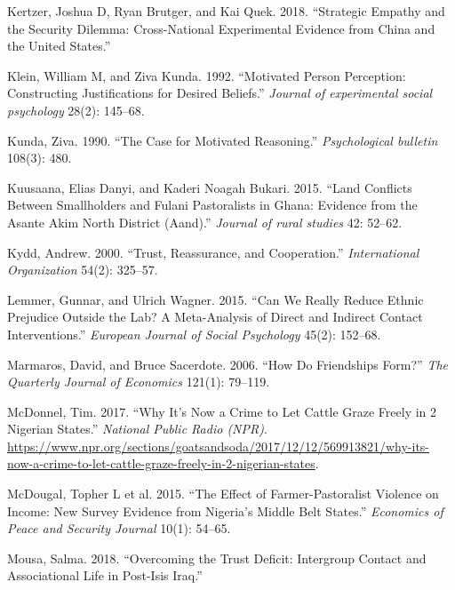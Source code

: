\documentclass[11pt]{article}
\begin{document}
\leavevmode\hypertarget{ref-kertzer2018empathy}{}%
Kertzer, Joshua D, Ryan Brutger, and Kai Quek. 2018. ``Strategic Empathy
and the Security Dilemma: Cross-National Experimental Evidence from
China and the United States.''

\leavevmode\hypertarget{ref-klein1992motivated}{}%
Klein, William M, and Ziva Kunda. 1992. ``Motivated Person Perception:
Constructing Justifications for Desired Beliefs.'' \emph{Journal of
experimental social psychology} 28(2): 145--68.

\leavevmode\hypertarget{ref-kunda1990motivatedReasoning}{}%
Kunda, Ziva. 1990. ``The Case for Motivated Reasoning.''
\emph{Psychological bulletin} 108(3): 480.

\leavevmode\hypertarget{ref-kuusaana2015land}{}%
Kuusaana, Elias Danyi, and Kaderi Noagah Bukari. 2015. ``Land Conflicts
Between Smallholders and Fulani Pastoralists in Ghana: Evidence from the
Asante Akim North District (Aand).'' \emph{Journal of rural studies} 42:
52--62.

\leavevmode\hypertarget{ref-kydd2000trust}{}%
Kydd, Andrew. 2000. ``Trust, Reassurance, and Cooperation.''
\emph{International Organization} 54(2): 325--57.

\leavevmode\hypertarget{ref-lemmer2015can}{}%
Lemmer, Gunnar, and Ulrich Wagner. 2015. ``Can We Really Reduce Ethnic
Prejudice Outside the Lab? A Meta-Analysis of Direct and Indirect
Contact Interventions.'' \emph{European Journal of Social Psychology}
45(2): 152--68.

\leavevmode\hypertarget{ref-marmaros2006friendships}{}%
Marmaros, David, and Bruce Sacerdote. 2006. ``How Do Friendships Form?''
\emph{The Quarterly Journal of Economics} 121(1): 79--119.

\leavevmode\hypertarget{ref-mcdonnel2017graze}{}%
McDonnel, Tim. 2017. ``Why It's Now a Crime to Let Cattle Graze Freely
in 2 Nigerian States.'' \emph{National Public Radio (NPR)}.
\url{https://www.npr.org/sections/goatsandsoda/2017/12/12/569913821/why-its-now-a-crime-to-let-cattle-graze-freely-in-2-nigerian-states}.

\leavevmode\hypertarget{ref-mcdougal2015effect}{}%
McDougal, Topher L et al. 2015. ``The Effect of Farmer-Pastoralist
Violence on Income: New Survey Evidence from Nigeria's Middle Belt
States.'' \emph{Economics of Peace and Security Journal} 10(1): 54--65.

\leavevmode\hypertarget{ref-mousa2018overcome}{}%
Mousa, Salma. 2018. ``Overcoming the Trust Deficit: Intergroup Contact
and Associational Life in Post-Isis Iraq.''
\end{document}
